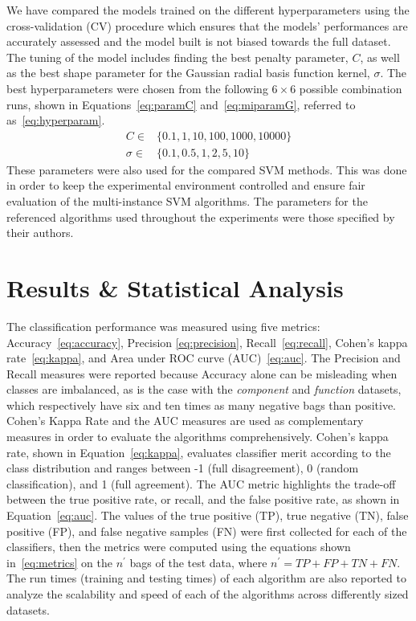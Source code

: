 \documentclass[reqno]{vcuthesis}
\numberwithin{equation}{chapter}
\begin{document}
We have compared the models trained on the different hyperparameters using the cross-validation (CV) procedure which ensures that the models’ performances are accurately assessed and the model built is not biased towards the full dataset. The tuning of the model includes finding the best penalty parameter, $C$, as well as the best shape parameter for the Gaussian radial basis function kernel, $\sigma$. The best hyperparameters were chosen from the following $6 \times 6$ possible combination runs, shown in Equations~\eqref{eq:paramC} and~\eqref{eq:miparamG}, referred to as~\eqref{eq:hyperparam}. 
\begin{subequations}
\label{eq:hyperparam}
\begin{align}
C \in  & \{0.1, 1, 10, 100, 1000, 10000\} \label{eq:paramC}\\
\sigma \in  & \{0.1, 0.5, 1, 2, 5, 10\} \label{eq:miparamG}
\end{align}
\end{subequations}
These parameters were also used for the compared SVM methods. This was done in order to keep the experimental environment controlled and ensure fair evaluation of the multi-instance SVM algorithms. The parameters for the referenced algorithms used throughout the experiments were those specified by their authors.

\section{Results \& Statistical Analysis}
The classification performance was measured using five metrics: Accuracy~\eqref{eq:accuracy}, Precision \eqref{eq:precision}, Recall~\eqref{eq:recall}, Cohen's kappa rate~\eqref{eq:kappa}, and Area under ROC curve (AUC)~\eqref{eq:auc}. The Precision and Recall measures were reported because Accuracy alone can be misleading when classes are imbalanced, as is the case with the \textit{component} and \textit{function} datasets, which respectively have six and ten times as many negative bags than positive. Cohen's Kappa Rate and the AUC measures are used as complementary measures in order to evaluate the algorithms comprehensively. Cohen's kappa rate, shown in Equation~\eqref{eq:kappa}, evaluates classifier merit according to the class distribution and ranges between -1 (full disagreement), 0 (random classification), and 1 (full agreement). The AUC metric highlights the trade-off between the true positive rate, or recall, and the false positive rate, as shown in Equation~\eqref{eq:auc}. The values of the true positive (TP), true negative (TN), false positive (FP), and false negative samples (FN) were first collected for each of the classifiers, then the metrics were computed using the equations shown in~\eqref{eq:metrics} on the $n^\prime$ bags of the test data, where $n^\prime = TP + FP + TN + FN$. The run times (training and testing times) of each algorithm are also reported to analyze the scalability and speed of each of the algorithms across differently sized datasets. 
\end{document}
